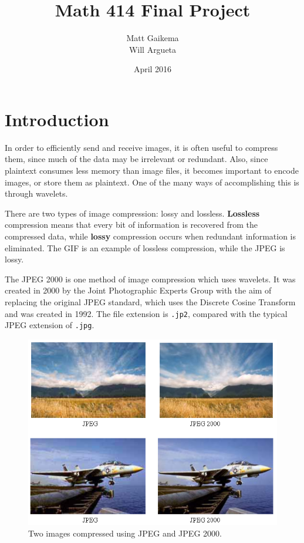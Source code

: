 \documentclass[12pt]{article}
\title{Math 414 Final Project}
\author{Matt Gaikema \\ Will Argueta}
\date{April 2016}
\begin{document}
\maketitle

\section{Introduction}

In order to efficiently send and receive images, it is often useful to compress them, 
since much of the data may be irrelevant or redundant.
Also, since plaintext consumes less memory than image files, it becomes important to encode images,
or store them as plaintext.
One of the many ways of accomplishing this is through wavelets.

There are two types of image compression: lossy and lossless.
\textbf{Lossless} compression means that every bit of information is recovered from the compressed data,
while \textbf{lossy} compression occurs when redundant information is eliminated.
The GIF is an example of lossless compression, while the JPEG is lossy.

The JPEG 2000 is one method of image compression which uses wavelets.
It was created in 2000 by the Joint Photographic Experts Group with the aim of replacing the original JPEG standard, 
which uses the Discrete Cosine Transform and was created in 1992.
The file extension is \verb|.jp2|, compared with the typical JPEG extension of \verb|.jpg|.

\begin{figure}[h]
	\centering
	\includegraphics[scale=0.4]{resources/comparison.png}
	\caption{Two images compressed using JPEG and JPEG 2000.\cite{comparison}}
	\label{fig:compare}
\end{figure}
\end{document}
